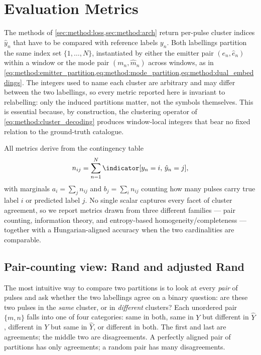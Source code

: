 \section{Evaluation Metrics}\label{sec:method:metrics}

The methods of \cref{sec:method:loss,sec:method:arch} return per-pulse cluster indices $\hat{y}_n$ that have to be compared with reference labels $y_n$.
Both labellings partition the same index set $\{1,\ldots,N\}$, instantiated by either the emitter pair $(e_n,\hat{e}_n)$ within a window or the mode pair $(m_n,\hat{m}_n)$ across windows, as in \cref{eq:method:emitter_partition,eq:method:mode_partition,eq:method:dual_embeddings}.
The integers used to name each cluster are arbitrary and may differ between the two labellings, so every metric reported here is invariant to relabelling: only the induced partitions matter, not the symbols themselves.
This is essential because, by construction, the clustering operator of \cref{eq:method:cluster_decoding} produces window-local integers that bear no fixed relation to the ground-truth catalogue.

All metrics derive from the contingency table
\[
  n_{ij}=\sum_{n=1}^N \indicator[y_n=i,\,\hat{y}_n=j],
\]
with marginals $a_i=\sum_j n_{ij}$ and $b_j=\sum_i n_{ij}$ counting how many pulses carry true label $i$ or predicted label $j$.
No single scalar captures every facet of cluster agreement, so we report metrics drawn from three different families --- pair counting, information theory, and entropy-based homogeneity/completeness --- together with a Hungarian-aligned accuracy when the two cardinalities are comparable.

\subsection*{Pair-counting view: Rand and adjusted Rand}

The most intuitive way to compare two partitions is to look at every \emph{pair} of pulses and ask whether the two labellings agree on a binary question: are these two pulses in the \emph{same} cluster, or in \emph{different} clusters?
Each unordered pair $\{m,n\}$ falls into one of four categories: same in both, same in $Y$ but different in $\hat{Y}$, different in $Y$ but same in $\hat{Y}$, or different in both.
The first and last are agreements; the middle two are disagreements.
A perfectly aligned pair of partitions has only agreements; a random pair has many disagreements.


